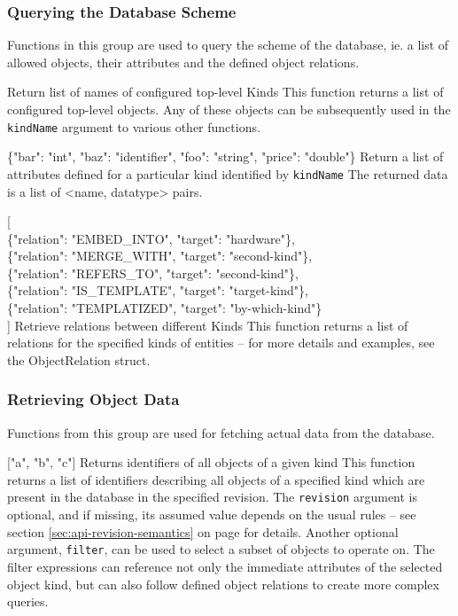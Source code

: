 \documentclass{article}
\begin{document}
\subsubsection{Querying the Database Scheme}
\label{sec:api-group-dbscheme}

Functions in this group are used to query the scheme of the database, ie. a list of allowed objects, their attributes
and the defined object relations.

    {Return list of names of configured top-level Kinds}
    {This function returns a list of configured top-level objects.  Any of these objects can be subsequently used in the
    {\tt kindName} argument to various other functions.  \deskaUnsortedRes}

    {\{"bar": "int", "baz": "identifier", "foo": "string", "price": "double"\}}
    {Return a list of attributes defined for a particular kind identified by {\tt kindName}}
    {The returned data is a list of \textless name, datatype\textgreater { }pairs.  \deskaUnsortedRes}

    { [ \\
            \{"relation": "EMBED\_INTO", "target": "hardware"\}, \\
            \{"relation": "MERGE\_WITH", "target": "second-kind"\}, \\
            \{"relation": "REFERS\_TO", "target": "second-kind"\}, \\
            \{"relation": "IS\_TEMPLATE", "target": "target-kind"\}, \\
            \{"relation": "TEMPLATIZED", "target": "by-which-kind"\} \\
            ]}
    {Retrieve relations between different Kinds}
    {This function returns a list of relations for the specified kinds of entities -- for more details and examples, see
    the ObjectRelation struct.  \deskaUnsortedRes}

\subsubsection{Retrieving Object Data}
\label{sec:api-group-data-retrieval}

Functions from this group are used for fetching actual data from the database.

    { ["a", "b", "c"] }
    {Returns identifiers of all objects of a given kind}
    {This function returns a list of identifiers describing all objects of a specified kind which are present in the
    database in the specified revision.  The {\tt revision} argument is optional, and if missing, its assumed value
    depends on the usual rules -- see section \ref{sec:api-revision-semantics} on page
    \pageref{sec:api-revision-semantics} for details.  Another optional argument, {\tt filter}, can be used to select
    a subset of objects to operate on.  The filter expressions can reference not only the immediate attributes of the
    selected object kind, but can also follow defined object relations to create more complex queries.  \deskaUnsortedRes}
\end{document}
